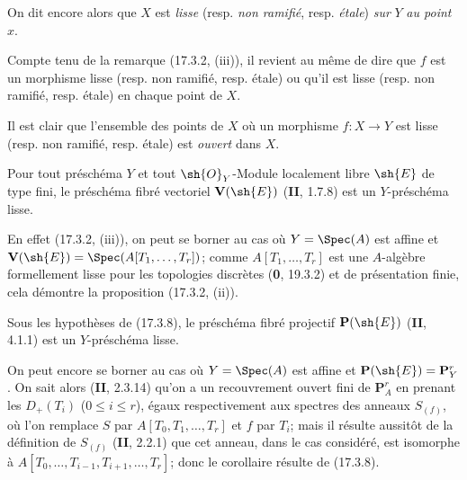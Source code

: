 On dit encore alors que $X$ est \emph{lisse} (resp. \emph{non ramifié}, resp. \emph{étale}) \emph{sur} $Y$ \emph{au point} $x$.

Compte tenu de la remarque (17.3.2, (iii)), il revient au même de dire que $f$ est un morphisme lisse (resp. non ramifié, resp. étale) ou qu'il est lisse (resp. non ramifié, resp. étale) en chaque point de $X$.

Il est clair que l'ensemble des points de $X$ où un morphisme $f:X\to Y$ est lisse (resp. non ramifié, resp. étale) est \emph{ouvert} dans $X$.

\begin{proposition}[17.3.8]
\label{IV.17.3.8}
Pour tout préschéma $Y$ et tout $\sh{O}_Y$-Module localement libre $\sh{E}$ de type fini, le préschéma fibré vectoriel $\mathbf{V}(\sh{E})$ \textup{(\textbf{II}, 1.7.8)} est un $Y$-préschéma lisse.
\end{proposition}

En effet (17.3.2, (iii)), on peut se borner au cas où $Y=\Spec(A)$ est affine et $\mathbf{V}(\sh{E})=\Spec(A[T_1,\ldots,T_r])$; comme $A[T_1,\ldots,T_r]$ est une $A$-algèbre formellement lisse pour les topologies discrètes (\textbf{0}, 19.3.2) et de présentation finie, cela démontre la proposition (17.3.2, (ii)).

\begin{corollary}[17.3.9]
\label{IV.17.3.9}
Sous les hypothèses de \textup{(17.3.8)}, le préschéma fibré projectif $\mathbf{P}(\sh{E})$ \textup{(\textbf{II}, 4.1.1)} est un $Y$-préschéma lisse.
\end{corollary}

On peut encore se borner au cas où $Y=\Spec(A)$ est affine et $\mathbf{P}(\sh{E})=\mathbf{P}^r_Y$. On sait alors (\textbf{II}, 2.3.14) qu'on a un recouvrement ouvert fini de $\mathbf{P}^r_A$ en prenant les $D_+(T_i)$ ($0\leq i\leq r$), égaux respectivement aux spectres des anneaux $S_{(f)}$, où l'on remplace $S$ par $A[T_0,T_1,\ldots,T_r]$ et $f$ par $T_i$; mais il résulte aussitôt de la définition de $S_{(f)}$ (\textbf{II}, 2.2.1) que cet anneau, dans le cas considéré, est isomorphe à $A[T_0,\ldots,T_{i-1},T_{i+1},\ldots,T_r]$; donc le corollaire résulte de (17.3.8).


